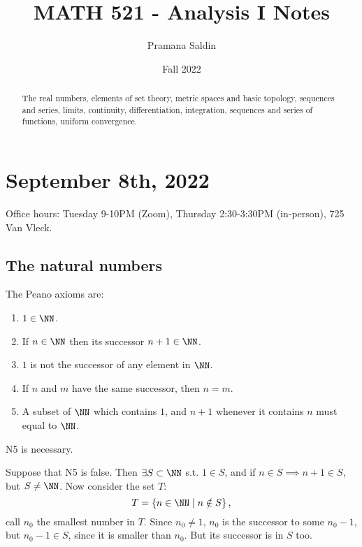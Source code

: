 \documentclass[11pt]{scrartcl}
\title{MATH 521 - Analysis I Notes}
\author{Pramana Saldin}
\date{Fall 2022}
\numberwithin{equation}{section}
\begin{document}
\maketitle
\begin{abstract}
    The real numbers, elements of set theory, metric spaces and basic topology, sequences and series, limits, continuity, differentiation, integration, sequences and series of functions, uniform convergence.    
\end{abstract}
\tableofcontents
\clearpage
\section{September 8th, 2022}
Office hours: Tuesday 9-10PM (Zoom), Thursday 2:30-3:30PM (in-person), 725 Van Vleck.
\subsection{The natural numbers}
\begin{axiom}
    The Peano axioms are:
    \begin{enumerate}[N1.]
        \item $1 \in \NN$.
        \item If $n\in\NN$ then its successor $n+1\in\NN$.
        \item $1$ is not the successor of any element in $\NN$. 
        \item If $n$ and $m$ have the same successor, then $n = m$.
        \item A subset of $\NN$ which contains $1$, and $n + 1$ whenever it contains $n$ must equal to $\NN$.
    \end{enumerate}
\end{axiom}
\begin{claim}
    \label{cl:n5necessary}
    N5 is necessary.
\end{claim}
\begin{subproof}
Suppose that N5 is false. Then $\exists S \subset \NN$ s.t. $1 \in S$, and if 
$n \in S \implies n+1\in S$, but $S \neq \NN$. Now consider the set $T$:
\[ T = \left\{n \in \NN\mid n\notin S\right\},\]
call $n_0$ the smallest number in $T$. Since $n_0\neq1$, $n_0$ is the successor to some $n_0-1$, but $n_0-1\in S$, since it is smaller than $n_0$. But its successor is in $S$ too.
\end{subproof}
\end{document}
